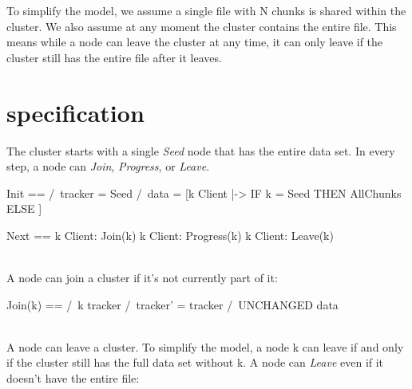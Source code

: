 To simplify the model, we assume a single file with N chunks is shared within
the cluster. We also assume at any moment the cluster contains the entire file.
This means while a node can leave the cluster at any time, it can only leave if
the cluster still has the entire file after it leaves.

\section{specification}

The cluster starts with a single \textit{Seed} node that has the entire data
set. In every step, a node can \textit{Join}, \textit{Progress}, or
\textit{Leave}.\\

\begin{tla}
Init ==
    /\ tracker = {Seed}
    /\ data = [k \in Client |-> IF k = Seed THEN AllChunks ELSE {}]

Next ==
    \/ \E k \in Client: 
        Join(k) 
    \/ \E k \in Client: 
        Progress(k)
    \/ \E k \in Client: 
        Leave(k)
\end{tla}
\begin{tlatex}
%
%
\@pvspace{8.0pt}%
%
%
%
%
%
%
%
\end{tlatex}
\\

A node can join a cluster if it's not currently part of it:\\
\begin{tla}
Join(k) == 
    /\ k \notin tracker
    /\ tracker' = tracker 
    /\ UNCHANGED data
\end{tla}
\begin{tlatex}
%
%
%
%
\end{tlatex}
\\

A node can leave a cluster. To simplify the model, a node k can leave if and
only if the cluster still has the full data set without k. A node can
\textit{Leave} even if it doesn't have the entire file:\\


